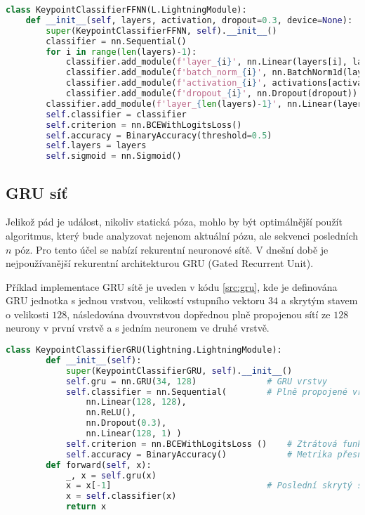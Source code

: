 \begin{lstlisting}[language=Python, label=src:ffnn_params, caption={Parametrizace konfigurace dopředné sítě}] 
class KeypointClassifierFFNN(L.LightningModule):
    def __init__(self, layers, activation, dropout=0.3, device=None):
        super(KeypointClassifierFFNN, self).__init__()        
        classifier = nn.Sequential()
        for i in range(len(layers)-1):
            classifier.add_module(f'layer_{i}', nn.Linear(layers[i], layers[i+1]))
            classifier.add_module(f'batch_norm_{i}', nn.BatchNorm1d(layers[i+1]))
            classifier.add_module(f'activation_{i}', activations[activation])
            classifier.add_module(f'dropout_{i}', nn.Dropout(dropout))
        classifier.add_module(f'layer_{len(layers)-1}', nn.Linear(layers[-1], 1))
        self.classifier = classifier
        self.criterion = nn.BCEWithLogitsLoss()
        self.accuracy = BinaryAccuracy(threshold=0.5)
        self.layers = layers
        self.sigmoid = nn.Sigmoid()   
\end{lstlisting}

\subsection{GRU síť}

Jelikož pád je událost, nikoliv statická póza, mohlo by být optimálnější použít
algoritmus, který bude analyzovat nejenom aktuální pózu, ale sekvenci
posledních $n$ póz. Pro tento účel se nabízí rekurentní neuronové sítě. V
dnešní době je nejpoužívanější rekurentní architekturou GRU (Gated Recurrent
Unit).

Příklad implementace GRU sítě je uveden v kódu \ref{src:gru}, kde je definována
GRU jednotka s jednou vrstvou, velikostí vstupního vektoru $34$ a skrytým
stavem o velikosti $128$, následována dvouvrstvou dopřednou plně propojenou
sítí ze $128$ neurony v první vrstvě a s jedním neuronem ve druhé vrstvě.

\begin{lstlisting}[language=Python, label=src:gru, caption={Ukázka implementace GRU sítě v PyTorch Lightning}]
    class KeypointClassifierGRU(lightning.LightningModule):
        def __init__(self):
            super(KeypointClassifierGRU, self).__init__()
            self.gru = nn.GRU(34, 128)              # GRU vrstvy
            self.classifier = nn.Sequential(        # Plně propojené vrstvy
                nn.Linear(128, 128),
                nn.ReLU(),
                nn.Dropout(0.3),
                nn.Linear(128, 1) )
            self.criterion = nn.BCEWithLogitsLoss ()    # Ztrátová funkce
            self.accuracy = BinaryAccuracy()            # Metrika přesnosti
        def forward(self, x):
            _, x = self.gru(x)
            x = x[-1]                               # Poslední skrytý stav
            x = self.classifier(x)
            return x
    
\end{lstlisting}

